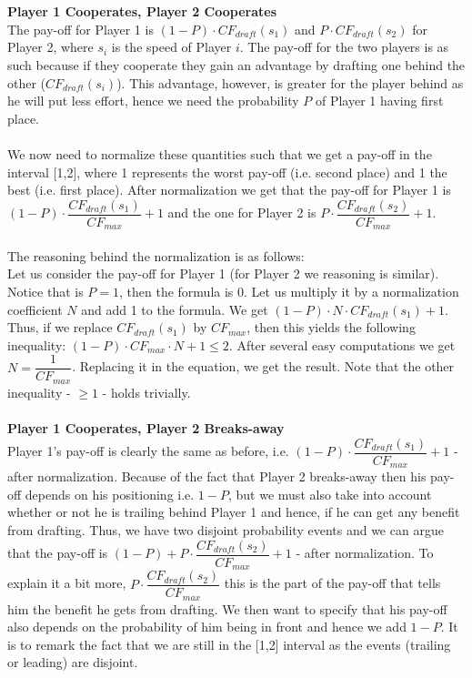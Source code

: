 \documentclass[10pt, a4paper]{report}
\begin{document}
\\\\
\textbf{Player 1 Cooperates, Player 2 Cooperates}
\\
The pay-off for Player 1 is $(1-P)\cdot CF_{draft}(s_1)$ and $P \cdot CF_{draft}(s_2)$ for Player 2, where $s_i$ is the speed of Player $i$. The pay-off for the two players is as such because if they cooperate they gain an advantage by drafting one behind the other ($CF_{draft}(s_i)$). This advantage, however, is greater for the player behind as he will put less effort, hence we need the probability $P$ of Player 1 having first place.
\\\\
We now need to normalize these quantities such that we get a pay-off in the interval [1,2], where 1 represents the worst pay-off (i.e. second place) and 1 the best (i.e. first place). After normalization we get that the pay-off for Player 1 is $(1-P)\cdot \dfrac{CF_{draft}(s_1)}{CF_{max}} + 1$ and the one for Player 2 is $P\cdot \dfrac{CF_{draft}(s_2)}{CF_{max}} + 1$.
\\\\
The reasoning behind the normalization is as follows:\\
Let us consider the pay-off for Player 1 (for Player 2 we reasoning is similar). Notice that is $P=1$, then the formula is 0. Let us multiply it by a normalization coefficient $N$ and add 1 to the formula. We get $(1-P)\cdot N\cdot CF_{draft}(s_1)  + 1$. Thus, if we replace $CF_{draft}(s_1)$ by $CF_{max}$, then this yields the following inequality: $(1-P)\cdot CF_{max} \cdot N + 1\le 2$. After several easy computations we get $N = \dfrac{1}{CF_{max}}$. Replacing it in the equation, we get the result. Note that the other inequality - $\ge 1$ - holds trivially.
\\\\
\textbf{Player 1 Cooperates, Player 2 Breaks-away}
\\
Player 1's pay-off is clearly the same as before, i.e. $(1-P)\cdot \dfrac{CF_{draft}(s_1)}{CF_{max}} + 1$ - after normalization. Because of the fact that Player 2 breaks-away then his pay-off depends on his positioning i.e. $1-P$, but we must also take into account whether or not he is trailing behind Player 1 and hence, if he can get any benefit from drafting. Thus, we have two disjoint probability events and we can argue that the pay-off is $(1-P) +  P\cdot \dfrac{CF_{draft}(s_2)}{CF_{max}} + 1$ - after normalization. To explain it a bit more, $P\cdot \dfrac{CF_{draft}(s_2)}{CF_{max}}$ this is the part of the pay-off that tells him the benefit he gets from drafting. We then want to specify that his pay-off also depends on the probability of him being in front and hence we add $1-P$. It is to remark the fact that we are still in the [1,2] interval as the events (trailing or leading) are disjoint.
\end{document}
